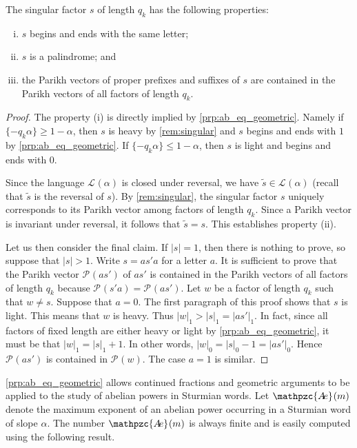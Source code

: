 \documentclass[a4paper,fleqn]{article}
\providecommand{\abs}[1]{\lvert#1\rvert}
\newcommand{\Lang}[2][]{\mathcal{L}_{#1}(#2)}
\newcommand{\mirror}[1]{\widetilde{#1}}
\newcommand{\Parikh}[2][]{\mathcal{P}_{#1}(#2)}
\newcommand{\abexp}[2][]{\mathpzc{A\mkern-3mu e}_{#1}(#2)}
\begin{document}
  \begin{lemma}\label{lem:singular_properties}
    The singular factor $s$ of length $q_k$ has the following properties:
    \begin{enumerate}[(i)]
      \item $s$ begins and ends with the same letter;
      \item $s$ is a palindrome; and
      \item the Parikh vectors of proper prefixes and suffixes of $s$ are contained in the Parikh vectors of all
            factors of length $q_k$.
    \end{enumerate}
  \end{lemma}
  \begin{proof}
    The property (i) is directly implied by \autoref{prp:ab_eq_geometric}. Namely if $\{-q_k\alpha\} \geq 1 - \alpha$,
    then $s$ is heavy by \autoref{rem:singular} and $s$ begins and ends with $1$ by \autoref{prp:ab_eq_geometric}. If
    $\{-q_k\alpha\} \leq 1 - \alpha$, then $s$ is light and begins and ends with $0$.

    Since the language $\Lang{\alpha}$ is closed under reversal, we have $\mirror{s} \in \Lang{\alpha}$ (recall that
    $\mirror{s}$ is the reversal of $s$). By \autoref{rem:singular}, the singular factor $s$ uniquely corresponds to
    its Parikh vector among factors of length $q_k$. Since a Parikh vector is invariant under reversal, it follows that
    $\mirror{s} = s$. This establishes property (ii).

    Let us then consider the final claim. If $\abs{s} = 1$, then there is nothing to prove, so suppose that
    $\abs{s} > 1$. Write $s = as' a$ for a letter $a$. It is sufficient to prove that the Parikh vector $\Parikh{as'}$
    of $as'$ is contained in the Parikh vectors of all factors of length $q_k$ because $\Parikh{s'a} = \Parikh{as'}$.
    Let $w$ be a factor of length $q_k$ such that $w \neq s$. Suppose that $a = 0$. The first paragraph of this proof
    shows that $s$ is light. This means that $w$ is heavy. Thus $\abs{w}_1 > \abs{s}_1 = \abs{as'}_1$. In fact, since
    all factors of fixed length are either heavy or light by \autoref{prp:ab_eq_geometric}, it must be that
    $\abs{w}_1 = \abs{s}_1 + 1$. In other words, $\abs{w}_0 = \abs{s}_0 - 1 = \abs{as'}_0$. Hence $\Parikh{as'}$ is
    contained in $\Parikh{w}$. The case $a = 1$ is similar.
  \end{proof}

  \autoref{prp:ab_eq_geometric} allows continued fractions and geometric arguments to be applied to the study of
  abelian powers in Sturmian words. Let $\abexp{m}$ denote the maximum exponent of an abelian power occurring in a
  Sturmian word of slope $\alpha$. The number $\abexp{m}$ is always finite and is easily computed using the following
  result.
\end{document}
